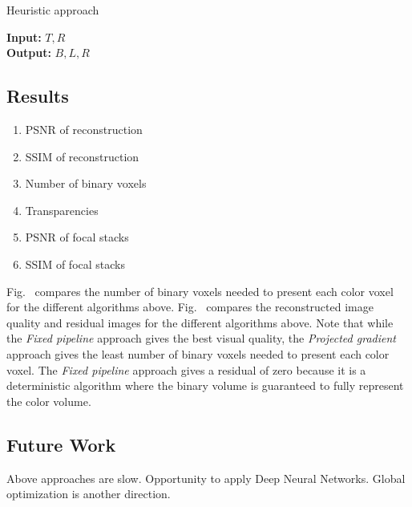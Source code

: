 \begin{algorithm}
    \caption{Heuristic approach}
    \label{alg:heuristics}
    \hspace*{\algorithmicindent}\textbf{Input:} $T, R$\\
    \hspace*{\algorithmicindent}\textbf{Output:} $B, L, R$
    \begin{algorithmic}[1]
        \ENDFOR
        \ENDIF
        \ENDFOR
        \ENDFOR
        \ENDFOR
    \end{algorithmic}
\end{algorithm}

\subsection{Results}
\begin{enumerate}
  \item PSNR of reconstruction
  \item SSIM of reconstruction
  \item Number of binary voxels
  \item Transparencies
  \item PSNR of focal stacks
  \item SSIM of focal stacks
\end{enumerate}



Fig.~ compares the number of binary voxels needed to present each color voxel for the different algorithms above. Fig.~ compares the reconstructed image quality and residual images for the different algorithms above. Note that while the \emph{Fixed pipeline} approach gives the best visual quality, the \emph{Projected gradient} approach gives the least number of binary voxels needed to present each color voxel. The \emph{Fixed pipeline} approach gives a residual of zero because it is a deterministic algorithm where the binary volume is guaranteed to fully represent the color volume.

\subsection{Future Work}
 Above approaches are slow. Opportunity to apply Deep Neural Networks. Global optimization is another direction.
